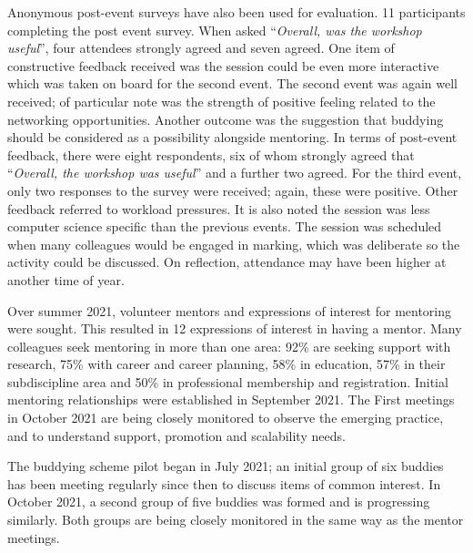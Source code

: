 \documentclass[sigconf]{acmart}
\begin{document}
Anonymous post-event surveys have also been used for evaluation. 11
participants completing the post event survey. When asked
``{\emph{Overall, was the workshop useful}}'', four attendees strongly
agreed and seven agreed. One item of constructive feedback received
was the session could be even more interactive which was taken on
board for the second event. The second event was again well received;
of particular note was the strength of positive feeling related to the
networking opportunities. Another outcome was the suggestion that
buddying should be considered as a possibility alongside mentoring. In
terms of post-event feedback, there were eight respondents, six of
whom strongly agreed that ``{\emph{Overall, the workshop was
useful}}'' and a further two agreed. For the third event, only two
responses to the survey were received; again, these were
positive. Other feedback referred to workload pressures. It is also noted the session was less computer science specific
than the previous events. The session was scheduled when many
colleagues would be engaged in marking, which was deliberate so the
activity could be discussed. On reflection, attendance may have been
higher at another time of year.
\begin{comment}
TO DO - evaluation of Mentoring - PH what is needed here? Is sufficient to indicate the first pilot of 10 Mentees has been established? Or do we need feedback from the participants?
\end{comment}

Over summer 2021, volunteer mentors and expressions of interest for
mentoring were sought. This resulted in 12 expressions of interest in
having a mentor. Many colleagues seek mentoring in more than one area:
92\% are seeking support with research, 75\% with career and career
planning, 58\% in education, 57\% in their subdiscipline area and 50\%
in professional membership and registration. Initial mentoring
relationships were established in September 2021. The First meetings
in October 2021 are being closely monitored to observe the emerging
practice, and to understand support, promotion and scalability needs.

\begin{comment}
To DO - evaluation of Buddying - PH what is needed here? Is sufficient to indicate the first pilot of 10 buddies has been established? Or do we need feedback from the participants?
\end{comment}

The buddying scheme pilot began in July 2021; an initial group of six
buddies has been meeting regularly since then to discuss items of
common interest. In October 2021, a second group of five buddies was
formed and is progressing similarly. Both groups are being closely
monitored in the same way as the mentor meetings.
\end{document}

